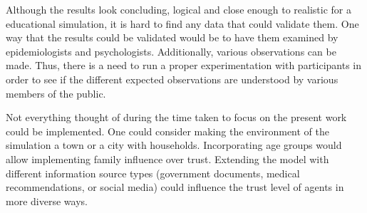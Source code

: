 Although the results look concluding, logical and close enough to realistic for a educational simulation, it is hard to find any data that could validate them. One way that the results could be validated would be to have them examined by epidemiologists and psychologists.
Additionally, various observations can be made. Thus, there is a need to run a proper experimentation with participants in order to see if the different expected observations are understood by various members of the public.

Not everything thought of during the time taken to focus on the present work could be implemented. One could consider making the environment of the simulation a town or a city with households. Incorporating age groups would allow implementing family influence over trust. Extending the model with different information source types (government documents, medical recommendations, or social media) could influence the trust level of agents in more diverse ways.
